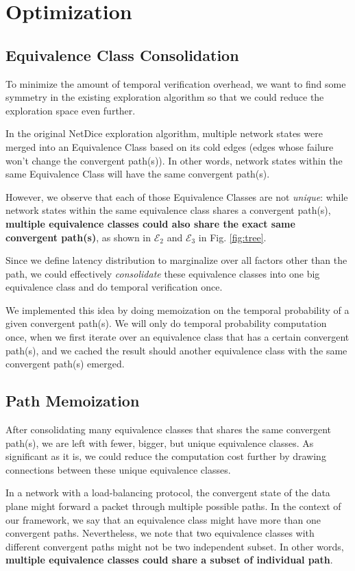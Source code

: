 \section{Optimization} \label{sec:opt}
\subsection{Equivalence Class Consolidation}
To minimize the amount of temporal verification overhead, we want to find some symmetry in the 
existing exploration algorithm so that we could reduce the exploration space even further.

In the original NetDice exploration algorithm, multiple network states were merged into an Equivalence 
Class based on its cold edges (edges whose failure won't change the convergent path(s)).
In other words, network states within the same Equivalence Class will have the same convergent path(s).

However, we observe that each of those Equivalence Classes are not \textit{unique}: while network states within 
the same equivalence class shares a convergent path(s), \textbf{multiple equivalence classes could also 
share the exact same convergent path(s)}, as shown in $\mathcal{E}_2$ and $\mathcal{E}_3$ in Fig. \ref{fig:tree}.

Since we define latency distribution to marginalize over all factors other than the path, we could 
effectively \textit{consolidate} these equivalence classes into one big equivalence class and do temporal 
verification once.

We implemented this idea by doing memoization on the temporal probability of a given convergent path(s).
We will only do temporal probability computation once, when we first iterate over an equivalence class that 
has a certain convergent path(s), and we cached the result should another equivalence class with the same 
convergent path(s) emerged.

\subsection{Path Memoization}
After consolidating many equivalence classes that shares the same convergent path(s), we are left with fewer, 
bigger, but unique equivalence classes.
As significant as it is, we could reduce the computation cost further by drawing connections between these 
unique equivalence classes.

In a network with a load-balancing protocol, the convergent state of the data plane might forward a packet 
through multiple possible paths.
In the context of our framework, we say that an equivalence class might have more than one convergent paths.
Nevertheless, we note that two equivalence classes with different convergent paths might not be two 
independent subset.
In other words, \textbf{multiple equivalence classes could share a subset of individual path}.

